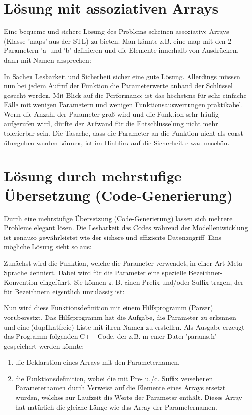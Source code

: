 \section{Lösung mit assoziativen Arrays}
Eine bequeme und sichere Lösung des Problems scheinen assoziative Arrays (Klasse 'maps' aus der STL) zu bieten. Man könnte z.B. eine map mit den 2 Parametern 'a' und 'b' definieren und die Elemente innerhalb von Ausdrückem dann mit Namen ansprechen:

\begin{shaded}
  \scriptsize
  
\end{shaded}

In Sachen Lesbarkeit und Sicherheit sicher eine gute Lösung. Allerdings müssen nun bei jedem Aufruf der Funktion die Parameterwerte anhand der Schlüssel gesucht werden. Mit Blick auf die Performance ist das höchstens für sehr einfache Fälle mit wenigen Parametern und wenigen Funktionsauswertungen praktikabel. Wenn die Anzahl der Parameter groß wird und die Funktion sehr häufig aufgerufen wird, dürfte der Aufwand für die Entschlüsselung nicht mehr tolerierbar sein. Die Tasache, dass die Parameter an die Funktion nicht als const übergeben werden können, ist im Hinblick auf die Sicherheit etwas unschön.

\section{Lösung durch mehrstufige Übersetzung (Code-Generierung)}
Durch eine mehrstufige Übersetzung (Code-Generierung) lassen sich mehrere Probleme elegant lösen. Die Lesbarkeit des Codes während der Modellentwicklung ist genauso gewährleistet wie der sichere und effiziente Datenzugriff. Eine mögliche Lösung sieht so aus:

Zunächst wird die Funktion, welche die Parameter verwendet, in einer Art Meta-Sprache definiert. Dabei wird für die Parameter eine spezielle Bezeichner-Konvention eingeführt. Sie können z. B. einen Prefix und/oder Suffix tragen, der für Bezeichnern eigentlich unzulässig ist:

\begin{shaded}
  \scriptsize
  
\end{shaded}

Nun wird diese Funktionsdefinition mit einem Hilfsprogramm (Parser) vorübersetzt. Das Hilfsprogramm hat die Aufgabe, die Parameter zu erkennen und eine (duplikatfreie) Liste mit ihren Namen zu erstellen. Als Ausgabe erzeugt das Programm folgenden C++ Code, der z.B. in einer Datei 'params.h' gespeichert werden könnte:
\begin{enumerate}
\item die Deklaration eines Arrays mit den Parameternamen,
\item die Funktionsdefinition, wobei die mit Pre- u./o. Suffix versehenen Parameternamen durch Verweise auf die Elemente eines Arrays ersetzt wurden, welches zur Laufzeit die Werte der Parameter enthält. Dieses Array hat natürlich die gleiche Länge wie das Array der Parameternamen.
\end{enumerate}

